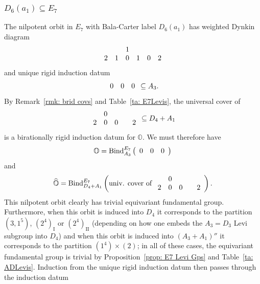 \documentclass[11pt]{amsart}
\renewcommand{\O}{{\mathbb O}}
\newcommand{\I}{{\mathfrak I}}
\newcommand{\II}{{\operatorname{II}}}
\renewcommand{\I}{{\operatorname{I}}}
\newcommand{\BInd}{{{\mbox{\rm Bind}}}}
\newcommand{\hatO}{\widehat{\O}}
\numberwithin{equation}{section}
\begin{document}
	\subsubsection{\texorpdfstring{$D_6(a_1)\subseteq E_7$}{D6a1 in E7}}\label{sss: D6a1 in E7}
	
	The nilpotent orbit in $E_7$ with Bala-Carter label $D_6(a_1)$ has weighted Dynkin diagram $$\begin{array}{c c c c c c}
		& & 1 & & & \\
		2 & 1 & 0 & 1 & 0 & 2 \\
	\end{array}$$ and unique rigid induction datum
	$$\begin{array}{c c c}
		0 & 0 & 0\\
	\end{array}\subseteq A_3.$$ By Remark~\ref{rmk: brid covs} and Table~\ref{ta: E7Levis}, the universal cover of $$\begin{array}{c c c c c}
		& 0 & & & \\
		2 & 0 & 0 &  & 2 \\
	\end{array}\subseteq D_4+A_1$$ is a birationally rigid induction datum for $\O$. We must therefore have
	$$\O = \BInd_{A_3}^{E_7}\left(\begin{array}{c c c}
		0 & 0 & 0\\
	\end{array}\right)$$
	and
	$$\hatO = \BInd_{D_4+ A_1}^{E_7}\left( \mbox{univ. cover of }\begin{array}{c c c c c}
		& 0 & & & \\
		2 & 0 & 0 & & 2 \\
	\end{array} \right).$$
	\iffalse	
	This nilpotent orbit clearly has trivial equivariant fundamental group. Furthermore, when this orbit is induced into $D_4$ it corresponds to the partition $(3,1^5)$, $(2^4)_\I$ or $(2^4)_{\II}$ (depending on how one embeds the $A_3=D_3$ Levi subgroup into $D_4$) and when this orbit is induced into $(A_3+A_1)''$ it corresponds to the partition $(1^4)\times (2)$; in all of these cases, the equivariant fundamental group is trivial by Proposition~\ref{prop: E7 Levi Gps} and Table~\ref{ta: ADLevis}. Induction from the unique rigid induction datum then passes through the induction datum 
\end{document}
